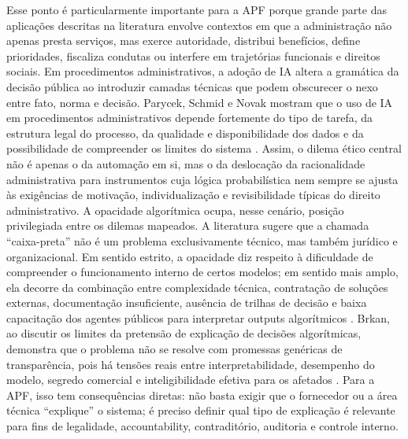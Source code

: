 \documentclass[12pt,a4paper]{article}
\begin{document}
Esse ponto é particularmente importante para a APF porque grande parte das aplicações descritas na literatura envolve contextos em que a administração não apenas presta serviços, mas exerce autoridade, distribui benefícios, define prioridades, fiscaliza condutas ou interfere em trajetórias funcionais e direitos sociais. Em procedimentos administrativos, a adoção de IA altera a gramática da decisão pública ao introduzir camadas técnicas que podem obscurecer o nexo entre fato, norma e decisão. Parycek, Schmid e Novak mostram que o uso de IA em procedimentos administrativos depende fortemente do tipo de tarefa, da estrutura legal do processo, da qualidade e disponibilidade dos dados e da possibilidade de compreender os limites do sistema \autocite{parycek2023artificial}. Assim, o dilema ético central não é apenas o da automação em si, mas o da deslocação da racionalidade administrativa para instrumentos cuja lógica probabilística nem sempre se ajusta às exigências de motivação, individualização e revisibilidade típicas do direito administrativo.
A opacidade algorítmica ocupa, nesse cenário, posição privilegiada entre os dilemas mapeados. A literatura sugere que a chamada “caixa-preta” não é um problema exclusivamente técnico, mas também jurídico e organizacional. Em sentido estrito, a opacidade diz respeito à dificuldade de compreender o funcionamento interno de certos modelos; em sentido mais amplo, ela decorre da combinação entre complexidade técnica, contratação de soluções externas, documentação insuficiente, ausência de trilhas de decisão e baixa capacitação dos agentes públicos para interpretar outputs algorítmicos \autocite{brkan2020legal} \autocite{mkander2023auditing}. Brkan, ao discutir os limites da pretensão de explicação de decisões algorítmicas, demonstra que o problema não se resolve com promessas genéricas de transparência, pois há tensões reais entre interpretabilidade, desempenho do modelo, segredo comercial e inteligibilidade efetiva para os afetados \autocite{brkan2020legal}. Para a APF, isso tem consequências diretas: não basta exigir que o fornecedor ou a área técnica “explique” o sistema; é preciso definir qual tipo de explicação é relevante para fins de legalidade, accountability, contraditório, auditoria e controle interno.
\end{document}
